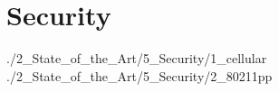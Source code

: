 \section{Security}
{./2_State_of_the_Art/5_Security/1_cellular}
{./2_State_of_the_Art/5_Security/2_80211pp}
